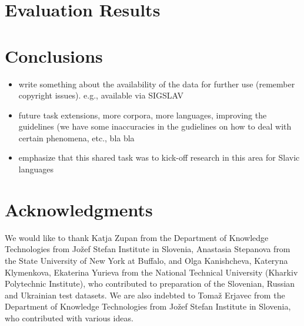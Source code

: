 \documentclass[11pt]{article}
\begin{document}
\section{Evaluation Results}
\label{sec:results}


\section{Conclusions}
\label{sec:conclusions}


\begin{itemize}

\item write something about the availability of the data for further use (remember copyright issues). e.g.,
available via SIGSLAV 

\item future task extensions, more corpora, more languages, improving the guidelines (we have some inaccuracies
in the gudielines on how to deal with certain phenomena, etc., bla bla

\item emphasize that this shared task was to kick-off research in this area for Slavic languages

\end{itemize}


\section*{Acknowledgments}


We would like to thank Katja Zupan from the Department of Knowledge Technologies from
Jožef Stefan Institute in Slovenia, Anastasia Stepanova from the State University of New York at Buffalo, 
and Olga Kanishcheva, Kateryna Klymenkova, Ekaterina Yurieva from the National Technical University 
(Kharkiv Polytechnic Institute), who contributed to preparation of the Slovenian, Russian and Ukrainian test 
datasets. We are also indebted to Tomaž Erjavec from the Department of Knowledge Technologies from Jožef Stefan 
Institute in Slovenia, who contributed with various ideas.






\end{document}
